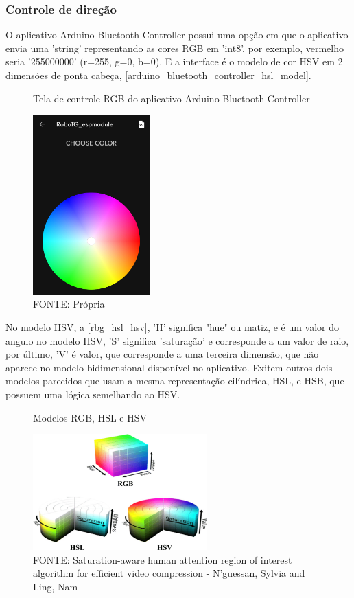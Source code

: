 \subsubsection{Controle de direção}

O aplicativo Arduino Bluetooth Controller possui uma opção em que o aplicativo envia uma
'string' representando as cores RGB em 'int8'.
por exemplo,  vermelho seria '255000000' (r=255, g=0, b=0).
E a interface é o modelo de cor HSV em 2 dimensões de ponta cabeça,
\autoref{arduino_bluetooth_controller_hsl_model}.


\begin{figure}[ht]
	\centering
	\caption{Tela de controle RGB do aplicativo Arduino Bluetooth Controller}
	\includegraphics[width=0.40\textwidth]{figures/andriod_bluetooth_controller_hsl_model}
    \caption*{FONTE: Própria}
	\label{arduino_bluetooth_controller_hsl_model}
\end{figure}

No modelo HSV,  a \autoref{rbg_hsl_hsv}, 'H' significa "hue" ou matiz, e é 
um valor do angulo no modelo HSV, 'S' significa 'saturação' e corresponde a um valor de raio,
por último, 'V' é valor, que corresponde a uma terceira dimensão, 
que não aparece no modelo bidimensional disponível no aplicativo.
Exitem outros dois modelos parecidos que usam a mesma representação cilíndrica, 
HSL, e HSB, que possuem uma lógica semelhando ao HSV.


\begin{figure}[ht]
	\centering
	\caption{Modelos RGB, HSL e HSV}
	\includegraphics[width=0.6\textwidth]{figures/RBG_HSL_HSV}
	\caption*{
        FONTE: Saturation-aware human attention region of interest algorithm for
        efficient video compression - N'guessan, Sylvia and Ling, Nam \cite{rbg_hsl_hsv}
    }
	\label{rbg_hsl_hsv}
\end{figure}

